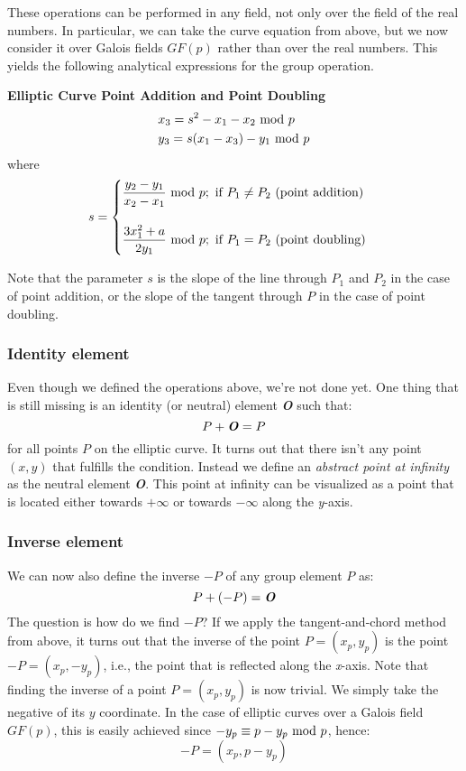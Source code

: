 \newpage
\hfill\break
These operations can be performed in any field, not only over the field of the real numbers. In particular, we can take the curve equation from above, but we now consider it over Galois fields $GF(p)$ rather than over the real numbers. This yields the following analytical expressions for the group operation.
\begin{framed}
    \hfill\break\textbf{Elliptic Curve Point Addition and Point Doubling}
    \begin{align*}
        &x_3=s^2-x_1-x_2\text{ mod } p\\
        &y_3=s(x_1-x_3)-y_1\text{ mod } p
    \end{align*}
    where
    \begin{equation*}
        s=\begin{cases}
            \dfrac{y_2-y_1}{x_2-x_1}\text{ mod } p; \text{ if $P_1\not=P_2$ (point addition)}\\\\
            \dfrac{3x_1^2+a}{2y_1}\text{ mod } p; \text{ if $P_1=P_2$ (point doubling)}
        \end{cases}
    \end{equation*}
\end{framed}
Note that the parameter $s$ is the slope of the line through $P_1$ and $P_2$ in the case of point addition, or the slope of the tangent through $P$ in the case of point doubling.

\subsubsection{Identity element}
Even though we defined the operations above, we're not done yet. One thing that is still missing is an identity (or neutral) element \textit{\textbf{O}} such that:
$$P+\text{\textbf{\textit{O}}}=P$$
for all points $P$ on the elliptic curve. It turns out that there isn't any point $(x,y)$ that fulfills the condition. Instead we define an \textit{abstract point at infinity} as the neutral element \textbf{\textit{O}}. This point at infinity can be visualized as a point that is located either towards $+\infty$ or towards $-\infty$ along the \textit{y}-axis.

\subsubsection{Inverse element}
We can now also define the inverse $-P$ of any group element $P$ as:
$$P+(-P)=\text{\textbf{\textit{O}}}$$
The question is how do we find $-P$? If we apply the tangent-and-chord method from above, it turns out that the inverse of the point $P=(x_p,y_p)$ is the point $-P=(x_p,-y_p)$, i.e., the point that is reflected along the \textit{x}-axis. Note that finding the inverse of a point $P=(x_p,y_p)$ is now trivial. We simply take the negative of its $y$ coordinate. In the case of elliptic curves over a Galois field $GF(p)$, this is easily achieved since $-y_p\equiv p-y_p\text{ mod } p$, hence:
$$-P=(x_p,p-y_p)$$

